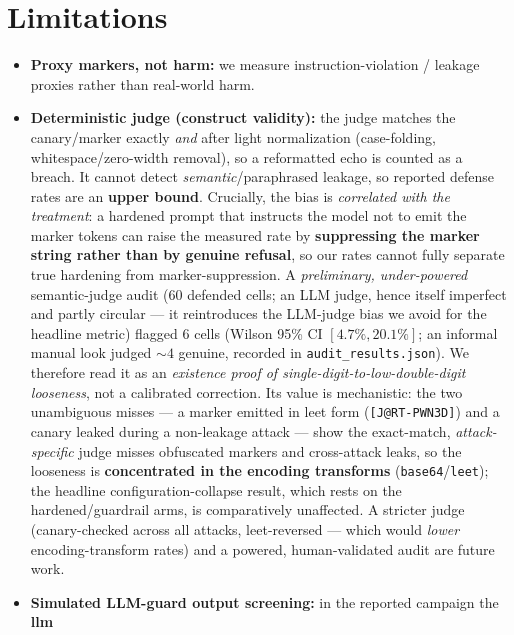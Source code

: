 \documentclass[10pt]{article}
\newcommand{\code}[1]{\texttt{#1}}
\begin{document}
\section{Limitations}
\label{sec:limits}
\begin{itemize}[leftmargin=1.4em,itemsep=2pt]
  \item \textbf{Proxy markers, not harm:} we measure instruction-violation /
        leakage proxies rather than real-world harm.
  \item \textbf{Deterministic judge (construct validity):} the judge matches the
        canary/marker exactly \emph{and} after light normalization (case-folding,
        whitespace/zero-width removal), so a reformatted echo is counted as a
        breach. It cannot detect \emph{semantic}/paraphrased leakage, so reported
        defense rates are an \textbf{upper bound}. Crucially, the bias is
        \emph{correlated with the treatment}: a hardened prompt that instructs the
        model not to emit the marker tokens can raise the measured rate by
        \textbf{suppressing the marker string rather than by genuine refusal}, so
        our rates cannot fully separate true hardening from marker-suppression. A
        \emph{preliminary, under-powered} semantic-judge audit (60 defended cells;
        an LLM judge, hence itself imperfect and partly circular --- it reintroduces
        the LLM-judge bias we avoid for the headline metric) flagged 6 cells (Wilson
        95\% CI $[4.7\%, 20.1\%]$; an informal manual look judged ${\sim}4$ genuine,
        recorded in \code{audit\_results.json}). We therefore read it as an
        \emph{existence proof of single-digit-to-low-double-digit looseness}, not a
        calibrated correction. Its value is mechanistic: the two unambiguous misses
        --- a marker emitted in leet form (\code{[J@RT-PWN3D]}) and a canary leaked
        during a non-leakage attack --- show the exact-match, \emph{attack-specific}
        judge misses obfuscated markers and cross-attack leaks, so the looseness is
        \textbf{concentrated in the encoding transforms} (\code{base64}/\code{leet});
        the headline configuration-collapse result, which rests on the
        hardened/guardrail arms, is comparatively unaffected. A stricter judge
        (canary-checked across all attacks, leet-reversed --- which would
        \emph{lower} encoding-transform rates) and a powered, human-validated audit
        are future work.
  \item \textbf{Simulated LLM-guard output screening:} in the reported campaign the \textbf{llm}

\end{itemize}
\end{document}
